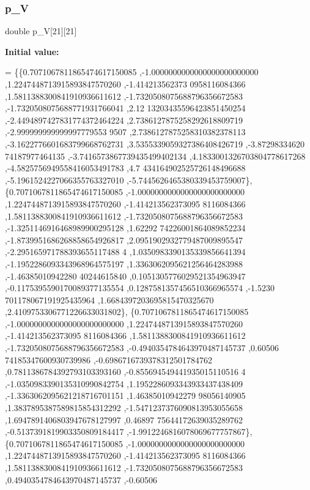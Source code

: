 \subsubsection{\texorpdfstring{p\+\_\+V}{p\_V}}
{\footnotesize\ttfamily double p\+\_\+V\mbox{[}21\mbox{]}\mbox{[}21\mbox{]}}

{\bfseries Initial value\+:}
\begin{DoxyCode}
= \{\{0.7071067811865474617150085 ,-1.0000000000000000000000000 ,1.2247448713915893847570260 ,-1.414213562373
      0958116084366 ,1.5811388300841910936611612 ,-1.7320508075688796356672583 ,-1.7320508075688771931766041 ,2.12
      13203435596423851450254 ,-2.4494897427831774372464224 ,2.7386127875258292618809719 ,-2.999999999999997779553
      9507 ,2.7386127875258310382378113 ,-3.1622776601683799668762731 ,3.5355339059327386408426719 ,-3.87298334620
      74187977464135 ,-3.7416573867739435499402134 ,4.1833001326703804778617268 ,-4.5825756949558416053491783 ,4.7
      434164902525726148496688 ,-5.1961524227066355763327010 ,-5.7445626465380339453759007\},
\{0.7071067811865474617150085 ,-1.0000000000000000000000000 ,1.2247448713915893847570260 ,-1.414213562373095
      8116084366 ,1.5811388300841910936611612 ,-1.7320508075688796356672583 ,-1.3251146916468989900295128 ,1.62292
      74226001864089852234 ,-1.8739951686268858654926817 ,2.0951902932779487009895547 ,-2.295165971788393655117488
      4 ,1.0350983390135339856641394 ,-1.1952286093343968964575197 ,1.3363062095621256464283988 ,-1.46385010942280
      40244615840 ,0.1051305776029521354963947 ,-0.1175395590170089377135554 ,0.1287581357456510366965574 ,-1.5230
      701178067191925435964 ,1.6684397203695815470325670 ,2.4109753306771226633031802\},
\{0.7071067811865474617150085 ,-1.0000000000000000000000000 ,1.2247448713915893847570260 ,-1.414213562373095
      8116084366 ,1.5811388300841910936611612 ,-1.7320508075688796356672583 ,-0.4940354784643970487145737 ,0.60506
      74185347600930739986 ,-0.6986716739378312501784762 ,0.7811386784392793103393160 ,-0.855694549441935015110516
      4 ,-1.0350983390135310990842754 ,1.1952286093343933437438409 ,-1.3363062095621218716701151 ,1.46385010942279
      98056140905 ,1.3837895387589815854312292 ,-1.5471237376090813953055658 ,1.6947891406803947678127997 ,0.46897
      75644172639035289762 ,-0.5137391819903350809184417 ,-1.9912246816078069677757867\},
\{0.7071067811865474617150085 ,-1.0000000000000000000000000 ,1.2247448713915893847570260 ,-1.414213562373095
      8116084366 ,1.5811388300841910936611612 ,-1.7320508075688796356672583 ,0.4940354784643970487145737 ,-0.60506

\end{DoxyCode}
